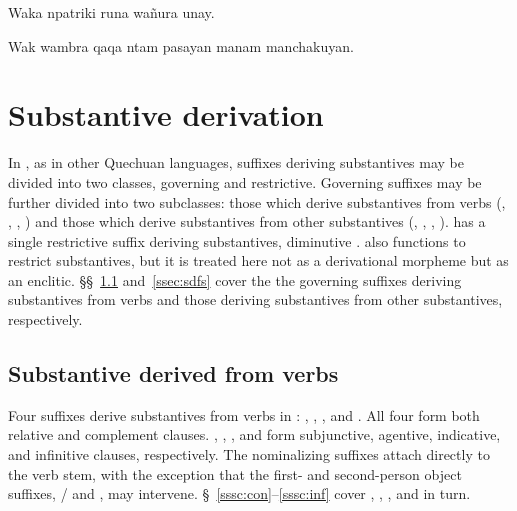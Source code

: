 %
{Waka npatriki runa wañura unay.}%
{}%
{}{}%

%
{Wak wambra qaqa ntam pasayan manam manchakuyan.}%
{}%
{}{}%

\section{Substantive derivation}
In \SYQ, as in other Quechuan languages, suffixes deriving substantives may be divided into two classes, governing and restrictive. Governing suffixes may be further divided into two subclasses: those which derive substantives from verbs (, , , ) and those which derive substantives from other substantives (, , , ). \SYQ{} has a single restrictive suffix deriving substantives, diminutive .  also functions to restrict substantives, but it is treated here not as a derivational morpheme but as an enclitic. §§~\ref{ssec:sdfv} and~\ref{ssec:sdfs} cover the the governing suffixes deriving substantives from verbs and those deriving substantives from other substantives, respectively.

\subsection{Substantive derived from verbs}\label{ssec:sdfv}
Four suffixes derive substantives from verbs in \SYQ{}: , , , and . All four form both relative and complement clauses. , , , and  form subjunctive, agentive, indicative, and infinitive clauses, respectively. The nominalizing suffixes attach directly to the verb stem, with the exception that the first- and second-person object suffixes, / and , may intervene. §~\ref{sssc:con}--\ref{sssc:inf} cover , , , and  in turn.

